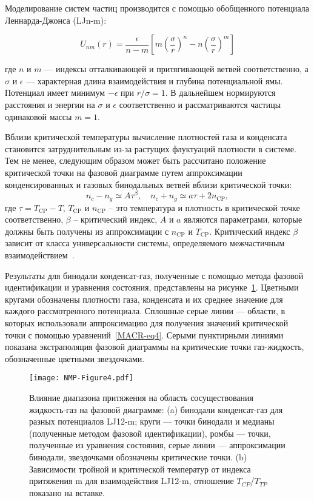 Моделирование систем частиц производится с помощью обобщенного потенциала Леннарда-Джонса (LJn-m):

\begin{equation}
U_{n m}(r)=\frac{\epsilon}{n-m}\left[m\left(\frac{\sigma}{r}\right)^{n}-n\left(\frac{\sigma}{r}\right)^{m}\right]
\label{LJnm}
\end{equation}

где $n$ и $m$ — индексы отталкивающей и притягивающей ветвей соответственно, а $\sigma$ и $\epsilon$ — характерная длина взаимодействия и глубина потенциальной ямы.
Потенциал имеет минимум $-\epsilon$ при $r/\sigma=1$.
В дальнейшем нормируются расстояния и энергии на $\sigma$ и $\epsilon$ соответственно и рассматриваются частицы одинаковой массы $m=1$.

Вблизи критической температуры вычисление плотностей газа и конденсата становится затруднительным из-за растущих флуктуаций плотности в системе.
Тем не менее, следующим образом может быть рассчитано положение критической точки на фазовой диаграмме путем аппроксимации конденсированных и газовых бинодальных ветвей вблизи критической точки:
\begin{equation}
    n_{c}-n_{g} \simeq A \tau^{\beta}, \quad n_{c}+n_{g} \simeq a \tau+2 n_{\mathrm{CP}},
\label{MACR-eq4}
\end{equation}
где $\tau=T_{\mathrm{CP}}-T$, $T_{\mathrm{CP}}$ и $n_{\mathrm{CP}}$ -- это температура и 
плотность в критической точке соответственно, $\beta$ -- критический индекс, $A$ и $a$ являются параметрами, которые должны быть получены из аппроксимации с $n_{\mathrm{CP}}$ и $T_{\mathrm{CP}}$.
Критический индекс $\beta$ зависит от класса универсальности системы, определяемого межчастичным взаимодействием~\cite{10.1103/physrevlett.89.025703}.

Результаты для бинодали конденсат-газ, полученные с помощью метода фазовой идентификации и уравнения состояния, представлены на рисунке~\ref{nmp}.
Цветными кругами обозначены плотности газа, конденсата и их среднее значение для каждого рассмотренного потенциала. 
Сплошные серые линии — области, в которых использовали аппроксимацию для получения значений критической точки с помощью уравнений~\ref{MACR-eq4}. 
Серыми пунктирными линиями показана экстраполяция фазовой диаграммы на критические точки газ-жидкость, обозначенные цветными звездочками.

\begin{figure}[!h]
\begin{center}
\texttt{[image: NMP-Figure4.pdf]}
\caption{Влияние диапазона притяжения на область сосуществования жидкость-газ на фазовой диаграмме: (a) бинодали конденсат-газ для разных потенциалов LJ12-m; круги — точки бинодали и медианы (полученные методом фазовой идентификации), ромбы — точки, полученные из уравнения состояния, серые линии — аппроксимации бинодали, звездочками обозначены критические точки.
	(b) Зависимости тройной и критической температур от индекса притяжения m для взаимодействия LJ12-m, отношение $T_{CP}$/$T_{TP}$ показано на вставке.}
\label{nmp}
\end{center}
\end{figure}

